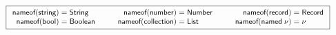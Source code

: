 \documentclass[10pt,preprint,clearpagebib]{sigplanconf}
\newcommand{\ident}[1]{\textnormal{\sffamily #1}}
\newcommand{\narrow}[1]{\hspace{-0.7em} #1 \hspace{-0.7em}}
\newcommand{\nameoftag}{\ident{nameof}}
\begin{document}
\begin{figure}
\begin{equation*}
\quad\qquad\boxed{
\begin{array}{rcl}
 \nameoftag(\ident{string}) &\narrow{=}& \ident{String} \\
 \nameoftag(\ident{bool}) &\narrow{=}& \ident{Boolean} \\
\end{array}
\qquad
\begin{array}{rcl}
 \nameoftag(\ident{number}) &\narrow{=}& \ident{Number} \\
 \nameoftag(\ident{collection}) &\narrow{=}& \ident{List} \\
\end{array}
\qquad
\begin{array}{rcl}
 \nameoftag(\ident{record}) &\narrow{=}& \ident{Record} \\
 \nameoftag(\ident{named}\;\nu) &\narrow{=}& \nu \\
\end{array}
}
\end{equation*}


\end{figure}
\end{document}
